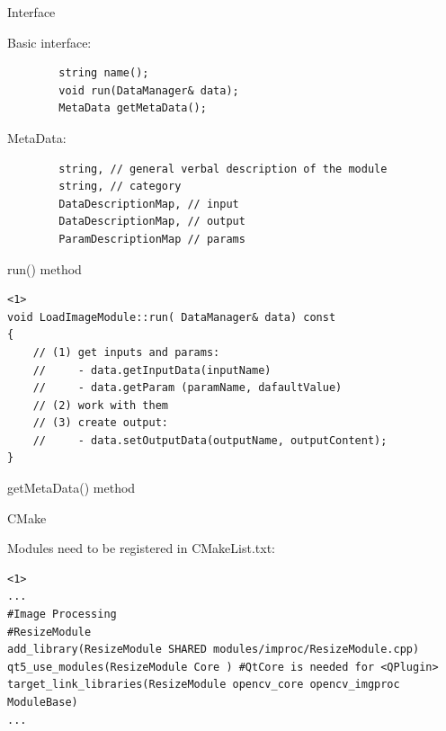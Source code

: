 \documentclass{beamer}
\begin{document}
\begin{frame}[fragile]{Interface}



	Basic interface: \newline

	\begin{lstlisting}
		string name();
		void run(DataManager& data);
		MetaData getMetaData();
	\end{lstlisting} \pause

 	MetaData: \newline

	\begin{lstlisting}
		string, // general verbal description of the module
		string, // category
		DataDescriptionMap, // input
		DataDescriptionMap, // output
		ParamDescriptionMap // params
	\end{lstlisting}


	\pnote{
	}

\end{frame}

\begin{frame}[fragile]{run() method}

	\begin{lstlisting}<1>
void LoadImageModule::run( DataManager& data) const
{
	// (1) get inputs and params:
	//     - data.getInputData(inputName)
	//     - data.getParam (paramName, dafaultValue)
	// (2) work with them
	// (3) create output:
	//     - data.setOutputData(outputName, outputContent);
}
	\end{lstlisting}

\end{frame}


\begin{frame}[fragile]{getMetaData() method}

\begin{linehighlight}{
}
      
\end{linehighlight}

\end{frame}


\begin{frame}[fragile]{CMake}

Modules need to be registered in CMakeList.txt: \newline

	\begin{lstlisting}<1>
...
#Image Processing
#ResizeModule
add_library(ResizeModule SHARED modules/improc/ResizeModule.cpp)
qt5_use_modules(ResizeModule Core ) #QtCore is needed for <QPlugin>
target_link_libraries(ResizeModule opencv_core opencv_imgproc ModuleBase)
...
	\end{lstlisting}


	\pnote{
	}

\end{frame}
\end{document}

